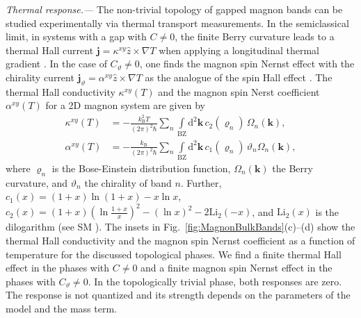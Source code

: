 \documentclass[aps,prb,twocolumn,amsmath,amssymb,floatfix]{revtex4-2}
\begin{document}
\textit{Thermal response.---}
The non-trivial topology of gapped magnon bands can be studied experimentally via thermal transport measurements. 
In the semiclassical limit, in systems with a gap with $C\neq 0$, the finite Berry curvature leads to a thermal Hall current $\mathbf{j} = \kappa^{xy} \hat{z}\times \nabla T$ when applying a longitudinal thermal gradient \cite{Matsumoto2011thermal}. In the case of $C_\vartheta \neq 0$, one finds the magnon spin Nernst effect with the chirality current $\mathbf{j}_\vartheta = \alpha^{xy} \hat{z}\times \nabla T$ as the analogue of the spin Hall effect \cite{Cheng2016Nernst}.
The thermal Hall conductivity $\kappa^{xy}(T)$ and the magnon spin Nerst coefficient $\alpha^{xy}(T)$ for a 2D magnon system are given by \cite{Matsumoto2011thermal,Cheng2016Nernst}
\begin{align}
    \kappa^{xy}(T) &= -\frac{k_\mathrm{B}^2 T}{(2\pi)^2 \hbar} \sum_n \int \limits_\mathrm{BZ} \mathrm{d}^2 \mathbf{k} \, c_2(\varrho_n)\, \Omega_n (\mathbf{k}), \\
    \alpha^{xy}(T) &= -\frac{k_\mathrm{B}}{(2\pi)^2 \hbar} \sum_n \int \limits_\mathrm{BZ} \mathrm{d}^2 \mathbf{k} \, c_1(\varrho_n)\, \vartheta_n \Omega_n (\mathbf{k}),
\end{align}
where $\varrho_n$ is the Bose-Einstein distribution function, $\Omega_n(\mathbf{k})$ the Berry curvature, and $\vartheta_n$ the chirality of band $n$. Further, $c_1(x) = (1+x)\ln (1+x) - x\ln x$,
$c_2(x) = (1+x)(\ln \frac{1+x}{x})^2 - (\ln x)^2 - 2\mathrm{Li}_2(-x)$, and $\mathrm{Li}_2(x)$ is the dilogarithm (see SM \cite{sm_note}). 
The insets in \mbox{Fig.~\ref{fig:MagnonBulkBands}(c)--(d)} show the thermal Hall conductivity and the magnon spin Nernst coefficient as a function of temperature for the discussed topological phases. 
We find a finite thermal Hall effect in the phases with $C\neq 0$ and a finite magnon spin Nernst effect in the phases with $C_\vartheta\neq 0$. In the topologically trivial phase, both responses are zero. The response is not quantized and its strength depends on the parameters of the model and the mass term.
\end{document}
